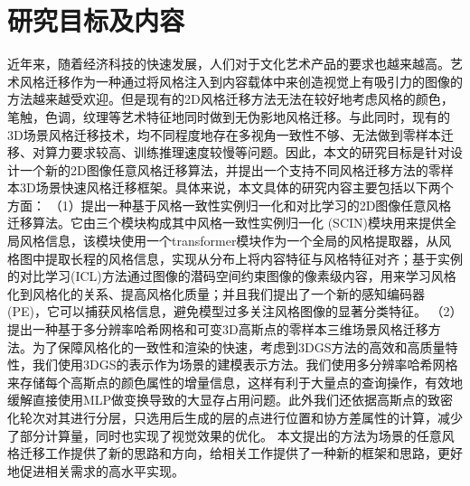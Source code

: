 

\section{研究目标及内容}
近年来，随着经济科技的快速发展，人们对于文化艺术产品的要求也越来越高。艺术风格迁移作为一种通过将风格注入到内容载体中来创造视觉上有吸引力的图像的方法越来越受欢迎。但是现有的2D风格迁移方法无法在较好地考虑风格的颜色，笔触，色调，纹理等艺术特征地同时做到无伪影地风格迁移。与此同时，现有的3D场景风格迁移技术，均不同程度地存在多视角一致性不够、无法做到零样本迁移、对算力要求较高、训练推理速度较慢等问题。因此，本文的研究目标是针对设计一个新的2D图像任意风格迁移算法，并提出一个支持不同风格迁移方法的零样本3D场景快速风格迁移框架。具体来说，本文具体的研究内容主要包括以下两个方面：
\newline \indent
（1）提出一种基于风格一致性实例归一化和对比学习的2D图像任意风格迁移算法。它由三个模块构成其中风格一致性实例归一化 (SCIN)模块用来提供全局风格信息，该模块使用一个transformer模块作为一个全局的风格提取器，从风格图中提取长程的风格信息，实现从分布上将内容特征与风格特征对齐；基于实例的对比学习(ICL)方法通过图像的潜码空间约束图像的像素级内容，用来学习风格化到风格化的关系、提高风格化质量；并且我们提出了一个新的感知编码器(PE)，它可以捕获风格信息，避免模型过多关注风格图像的显著分类特征。   
\newline \indent
（2）提出一种基于多分辨率哈希网格和可变3D高斯点的零样本三维场景风格迁移方法。为了保障风格化的一致性和渲染的快速，考虑到3DGS方法的高效和高质量特性，我们使用3DGS的表示作为场景的建模表示方法。我们使用多分辨率哈希网格来存储每个高斯点的颜色属性的增量信息，这样有利于大量点的查询操作，有效地缓解直接使用MLP做变换导致的大显存占用问题。此外我们还依据高斯点的致密化轮次对其进行分层，只选用后生成的层的点进行位置和协方差属性的计算，减少了部分计算量，同时也实现了视觉效果的优化。
\newline \indent	
本文提出的方法为场景的任意风格迁移工作提供了新的思路和方向，给相关工作提供了一种新的框架和思路，更好地促进相关需求的高水平实现。

